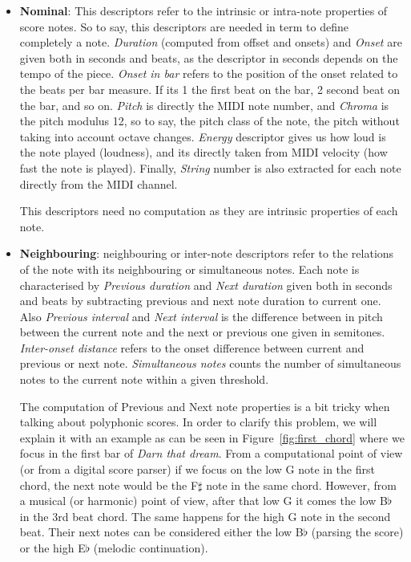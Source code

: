 \begin{itemize}
\item \textbf{Nominal}: This descriptors refer to the intrinsic or intra-note properties of score notes. So to say, this descriptors are needed in term to define completely a note. \textit{Duration} (computed from offset and onsets) and \textit{Onset} are given both in seconds and beats, as the descriptor in seconds depends on the tempo of the piece. \textit{Onset in bar} refers to the position of the onset related to the beats per bar measure. If its 1 the first beat on the bar, 2 second beat on the bar, and so on. \textit{Pitch} is directly the MIDI note number, and \textit{Chroma} is the pitch modulus 12, so to say, the pitch class of the note, the pitch without taking into account octave changes. \textit{Energy} descriptor gives us how loud is the note played (loudness), and its directly taken from MIDI velocity (how fast the note is played). Finally, \textit{String} number is also extracted for each note directly from the MIDI channel.

This descriptors need no computation as they are intrinsic properties of each note.

\item \textbf{Neighbouring}: neighbouring or inter-note descriptors refer to the relations of the note with its neighbouring or simultaneous notes. Each note is characterised by \textit{Previous duration} and \textit{Next duration} given both in seconds and beats by subtracting previous and next note duration to current one. Also \textit{Previous interval} and \textit{Next interval} is the difference between in pitch between the current note and the next or previous one given in semitones. \textit{Inter-onset distance} refers to the onset difference between current and previous or next note. \textit{Simultaneous notes} counts the number of simultaneous notes to the current note within a given threshold.

The computation of Previous and Next note properties is a bit tricky when talking about polyphonic scores. In order to clarify this problem, we will explain it with an example as can be seen in Figure~\ref{fig:first_chord} where we focus in the first bar of \textit{Darn that dream}. From a computational point of view (or from a digital score parser) if we focus on the low G note in the first chord, the next note would be the F$\sharp$ note in the same chord. However, from a musical (or harmonic) point of view, after that low G it comes the low B$\flat$ in the 3rd beat chord. The same happens for the high G note in the second beat. Their next notes can be considered either the low B$\flat$ (parsing the score) or the high E$\flat$ (melodic continuation).


\end{itemize}
